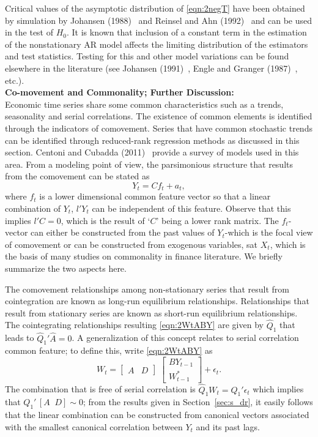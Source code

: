 Critical values of the asymptotic distribution of \eqref{eqn:2negT} have been obtained by simulation by Johansen (1988)~\cite{johansen1988statistical} and Reinsel and Ahn (1992)~\cite{reinsel1992vector} and can be used in the test of $H_0$. It is known that inclusion of a constant term in the estimation of the nonstationary AR model affects the limiting distribution of the estimators and test statistics. Testing for this and other model variations can be found elsewhere in the literature (see Johansen (1991)~\cite{johansen1991estimation}, Engle and Granger (1987)~\cite{engle1987co}, etc.). \\


\noindent \textbf{Co-movement and Commonality; Further Discussion:} \\


Economic time series share some common characteristics such as a trends, seasonality and serial correlations. The existence of common elements is identified through the indicators of comovement. Series that have common stochastic trends can be identified through reduced-rank regression methods as discussed in this section. Centoni and Cubadda (2011)~\cite{centoni} provide a survey of models used in this area. From a modeling point of view, the parsimonious structure that results from the comovement can be stated as
	\begin{equation} \label{eqn:discyt}
	Y_t= Cf_t + a_t,
	\end{equation}  
where $f_t$ is a lower dimensional common feature vector so that a linear combination of $Y_t$, $l' Y_t$ can be independent of this feature. Observe that this implies $l'C=0$, which is the result of `$C$' being a lower rank matrix. The $f_t$-vector can either be constructed from the past values of $Y_t$-which is the focal view of comovement or can be constructed from exogenous variables, sat $X_t$, which is the basis of many studies on commonality in finance literature. We briefly summarize the two aspects here. 


The comovement relationships among non-stationary series that result from cointegration are known as long-run equilibrium relationships. Relationships that result from stationary series are known as short-run equilibrium relationships. The cointegrating relationships resulting  \eqref{eqn:2WtABY} are given by $\hat{Q}_1$ that leads to $\hat{Q}_1' \hat{A}=0$. A generalization of this concept relates to serial correlation common feature; to define this, write \eqref{eqn:2WtABY} as
	\begin{equation} \label{eqn:wtrewrite}
	W_t=  \begin{bmatrix} A & D \end{bmatrix} \; \begin{bmatrix} BY_{t-1} \\ W_{t-1}^* \end{bmatrix} + \epsilon_t.
	\end{equation}
The combination that is free of serial correlation is $\hat{Q}_1W_t= Q_1' \epsilon_t$ which implies that $Q_1' \,[A \;\; D] \sim 0$; from the results given in Section~\ref{sec:s_dr}, it easily follows that the linear combination can be constructed from canonical vectors associated with the smallest canonical correlation between $Y_t$ and its past lags.



